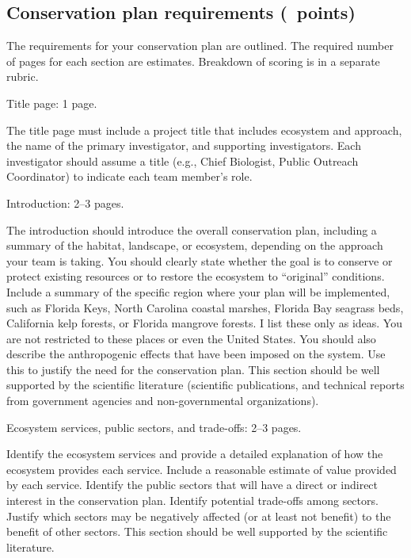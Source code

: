 \documentclass[12pt, hidelinks, addpoints]{exam}
\begin{document}
\subsection*{Conservation plan requirements (\numpoints~points)}

The requirements for your conservation plan are outlined. The required number of pages for each section are estimates. Breakdown of scoring is in a separate rubric.

\begin{questions}

\question[5]
Title page: 1 page.

The title page must include a project title that includes ecosystem and approach, the name of the primary investigator, and supporting investigators. Each investigator should assume a title (e.g., Chief Biologist, Public Outreach Coordinator) to indicate each team member's role. 

\question[15]
Introduction: 2--3 pages.

	The introduction should introduce the overall conservation plan, including a summary of the habitat, landscape,  or ecosystem, depending on the approach your team is taking.  You should clearly state whether the goal is to conserve or protect existing resources or to restore the ecosystem to ``original'' conditions. Include a summary of the specific region where your plan will be implemented, such as Florida Keys, North Carolina coastal marshes, Florida Bay seagrass beds, California kelp forests, or Florida mangrove forests. I list these only as ideas. You are not restricted to these places or even the United States. You should also describe the anthropogenic effects that have been imposed on the system. Use this to justify the need for the conservation plan. This section should be well supported by the scientific literature (scientific publications,  and technical reports from government agencies and non-governmental organizations). 


\question[20]
Ecosystem services, public sectors, and trade-offs: 2--3 pages.

	Identify the ecosystem services and provide a detailed explanation of how the ecosystem provides each service. Include a reasonable estimate of value provided by each service. Identify the public sectors that will have a direct or indirect interest in the conservation plan. Identify potential trade-offs among sectors. Justify which sectors may be negatively affected (or at least not benefit) to the benefit of other sectors. This section should be well supported by the scientific literature.


\end{questions}
\end{document}
